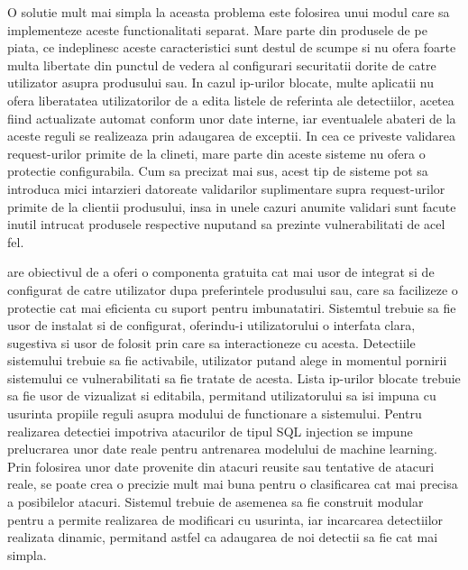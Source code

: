 O solutie mult mai simpla la aceasta problema este folosirea unui modul care sa implementeze aceste functionalitati separat. Mare parte din produsele de pe piata, ce indeplinesc aceste caracteristici sunt destul de scumpe si nu ofera foarte multa libertate din punctul de vedera al configurari securitatii dorite de catre utilizator asupra produsului sau. In cazul ip-urilor blocate, multe aplicatii nu ofera liberatatea utilizatorilor de a edita listele de referinta ale detectiilor, acetea fiind actualizate automat conform unor date interne, iar eventualele abateri de la aceste reguli se realizeaza prin adaugarea de exceptii. In cea ce priveste validarea request-urilor primite de la clineti, mare parte din aceste sisteme nu ofera o protectie configurabila. Cum sa precizat mai sus, acest tip de sisteme pot sa introduca mici intarzieri datoreate validarilor suplimentare supra request-urilor primite de la clientii produsului, insa in unele cazuri anumite validari sunt facute inutil intrucat produsele respective nuputand sa prezinte vulnerabilitati de acel fel.

 \textit{\thesistitle} are obiectivul de a oferi o componenta gratuita cat mai usor de integrat si de configurat de catre utilizator dupa preferintele produsului sau, care sa facilizeze o protectie cat mai eficienta cu suport pentru imbunatatiri. Sistemtul trebuie sa fie usor de instalat si de configurat, oferindu-i utilizatorului o interfata clara, sugestiva si usor de folosit prin care sa interactioneze cu acesta. Detectiile sistemului trebuie sa fie activabile, utilizator putand alege in momentul  pornirii sistemului ce vulnerabilitati sa fie tratate de acesta. Lista ip-urilor blocate trebuie sa fie usor de vizualizat si editabila, permitand utilizatorului sa isi impuna cu usurinta propiile reguli asupra modului de functionare a sistemului. Pentru realizarea detectiei impotriva atacurilor de tipul SQL injection se impune prelucrarea unor date reale pentru antrenarea modelului de machine learning. Prin folosirea unor date provenite din atacuri reusite sau tentative de atacuri reale, se poate crea o precizie mult mai buna pentru o clasificarea cat mai precisa a posibilelor atacuri. Sistemul trebuie de asemenea sa fie construit modular pentru a permite realizarea de modificari cu usurinta, iar incarcarea detectiilor realizata dinamic, permitand astfel ca adaugarea de noi detectii sa fie cat mai simpla.




